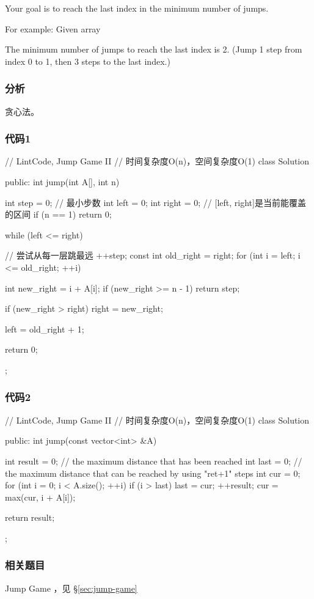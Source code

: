 Your goal is to reach the last index in the minimum number of jumps.

For example:
Given array 

The minimum number of jumps to reach the last index is 2. (Jump 1 step from index 0 to 1, then 3 steps to the last index.)


\subsubsection{分析}
贪心法。


\subsubsection{代码1}
\begin{Code}
// LintCode, Jump Game II
// 时间复杂度O(n)，空间复杂度O(1)
class Solution {
public:
    int jump(int A[], int n) {
        int step = 0; // 最小步数
        int left = 0;
        int right = 0;  // [left, right]是当前能覆盖的区间
        if (n == 1) return 0;

        while (left <= right) { // 尝试从每一层跳最远
            ++step;
            const int old_right = right;
            for (int i = left; i <= old_right; ++i) {
                int new_right = i + A[i];
                if (new_right >= n - 1) return step;

                if (new_right > right) right = new_right;
            }
            left = old_right + 1;
        }
        return 0;
    }
};
\end{Code}


\subsubsection{代码2}
\begin{Code}
// LintCode, Jump Game II
// 时间复杂度O(n)，空间复杂度O(1)
class Solution {
public:
    int jump(const vector<int> &A) {
        int result = 0;
        // the maximum distance that has been reached
        int last = 0;
        // the maximum distance that can be reached by using "ret+1" steps
        int cur = 0;
        for (int i = 0; i < A.size(); ++i) {
            if (i > last) {
                last = cur;
                ++result;
            }
            cur = max(cur, i + A[i]);
        }

        return result;
    }
};
\end{Code}


\subsubsection{相关题目}
\begindot
\item Jump Game ，见 \S \ref{sec:jump-game}
\myenddot


